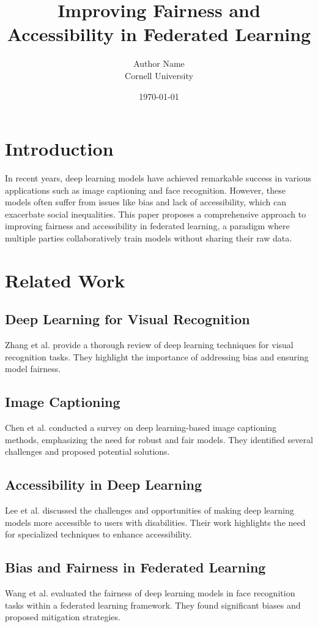 \documentclass{article}
\title{Improving Fairness and Accessibility in Federated Learning}
\author{Author Name \\ Cornell University}
\date{\today}
\begin{document}
\maketitle

\section{Introduction}
In recent years, deep learning models have achieved remarkable success in various applications such as image captioning and face recognition. However, these models often suffer from issues like bias and lack of accessibility, which can exacerbate social inequalities. This paper proposes a comprehensive approach to improving fairness and accessibility in federated learning, a paradigm where multiple parties collaboratively train models without sharing their raw data.

\section{Related Work}
\subsection{Deep Learning for Visual Recognition}
Zhang et al. \cite{zhang2020deep} provide a thorough review of deep learning techniques for visual recognition tasks. They highlight the importance of addressing bias and ensuring model fairness.

\subsection{Image Captioning}
Chen et al. \cite{chen2021survey} conducted a survey on deep learning-based image captioning methods, emphasizing the need for robust and fair models. They identified several challenges and proposed potential solutions.

\subsection{Accessibility in Deep Learning}
Lee et al. \cite{lee2022accessibility} discussed the challenges and opportunities of making deep learning models more accessible to users with disabilities. Their work highlights the need for specialized techniques to enhance accessibility.

\subsection{Bias and Fairness in Federated Learning}
Wang et al. \cite{wang2020evaluating} evaluated the fairness of deep learning models in face recognition tasks within a federated learning framework. They found significant biases and proposed mitigation strategies.
\end{document}
